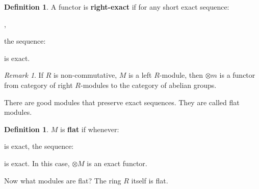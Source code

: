 \documentclass[9pt,reqno,twoside]{amsbook}
\theoremstyle{plain}
\numberwithin{section}{chapter}
\numberwithin{equation}{chapter}
\theoremstyle{definition}
\newtheorem{Def}[theorem]{Definition}
\theoremstyle{remark}
\newtheorem{rem}[theorem]{Remark}
\theoremstyle{plain}
\newcommand{\tens}{\otimes}
\renewcommand{\phi}{\varphi}
\begin{document}
\begin{Def}
A functor is \textbf{right-exact} if for any short exact sequence:
\begin{center}
,
\end{center}
the sequence:
\begin{center}
\end{center}
is exact. 
\end{Def}


\begin{rem}
If $R$ is non-commutative, $M$ is a left $R$-module, then $\tens m$ is a functor from category of right $R$-modules to the category of abelian groups. 
\end{rem}

There are good modules that preserve exact sequences. They are called flat modules. 

\begin{Def}
$M$ is \textbf{flat} if whenever:
\begin{center}
\end{center}
is exact, the sequence:
\begin{center}
\end{center}
is exact. In this case, $\tens M$ is an exact functor. 
\end{Def}

Now what modules are flat? The ring $R$ itself is flat. 
\end{document}
